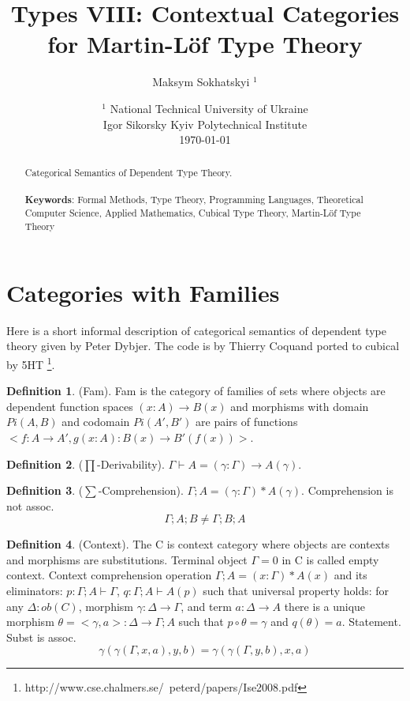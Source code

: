 \documentclass{article}
\theoremstyle{definition}
\newtheorem{definition}{Definition}
\begin{document}
\title{Types VIII: Contextual Categories \\ for Martin-Löf Type Theory}
\author{Maksym Sokhatskyi $^1$}
\date{ $^1$ National Technical University of Ukraine \\
       \small Igor Sikorsky Kyiv Polytechnical Institute \\
       \today }

\maketitle

\begin{abstract}

Categorical Semantics of Dependent Type Theory.
\\
\\
{\bf Keywords}: Formal Methods, Type Theory, Programming Languages,
          Theoretical Computer Science, Applied Mathematics,
          Cubical Type Theory, Martin-Löf Type Theory
\end{abstract}
\tableofcontents

\newpage
\section{Categories with Families}

Here is a short informal description of
categorical semantics of dependent type theory given by Peter Dybjer.
The code is by Thierry Coquand ported to cubical by 5HT
\footnote{http://www.cse.chalmers.se/~peterd/papers/Ise2008.pdf}.

\begin{definition} (Fam). Fam is the category of families
of sets where objects are dependent function
spaces $(x:A)\rightarrow B(x)$ and morphisms with domain
$Pi(A,B)$ and codomain $Pi(A',B')$ are pairs of
functions $<f:A\rightarrow A',g(x:A):B(x)\rightarrow B'(f(x))>$.
\end{definition}

\begin{definition} ($\prod$-Derivability).
$\Gamma\vdash A = (\gamma:\Gamma)\rightarrow A(\gamma)$.
\end{definition}

\begin{definition} ($\sum$-Comprehension).
$\Gamma;A = (\gamma:\Gamma)*A(\gamma)$. Comprehension is not assoc.
$$
    \Gamma;A;B \neq \Gamma;B;A
$$
\end{definition}

\begin{definition} (Context).
The C is context category where objects are contexts and morphisms are substitutions.
Terminal object $\Gamma=0$ in C is called empty context.
Context comprehension operation $\Gamma;A = (x:\Gamma)*A(x)$ and
its eliminators: $p:\Gamma;A\vdash\Gamma$, $q:\Gamma;A\vdash A(p)$ such that
universal property holds: for any $\Delta:ob(C)$, morphism $\gamma:\Delta\rightarrow\Gamma$,
and term $a:\Delta\rightarrow A$ there is a unique morphism $\theta=<\gamma,a>:\Delta\rightarrow\Gamma;A$
such that $p\circ\theta=\gamma$ and $q(\theta)=a$. Statement. Subst is assoc.
$$
    \gamma(\gamma(\Gamma,x,a),y,b) = \gamma(\gamma(\Gamma,y,b),x,a)
$$
\end{definition}
\end{document}
